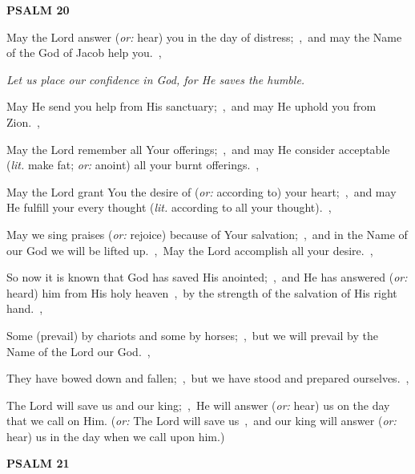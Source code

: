 \documentclass[12pt,twoside,a5paper]{article}
\newcommand{\psalm}[1]{\textbf{PSALM {#1}}}
\newcommand{\qanona}[1]{{\liturgicalhint{Qanona.} \emph{#1}}}
\newcommand{\translationoption}[1]{\emph{or:} #1}
\newcommand{\translationliteral}[1]{\emph{lit.} #1}
\begin{document}
\psalm{20}

\begin{normalparskip}
  May the Lord answer (\translationoption{hear}) you in the day of distress;~\sep\ and may the Name of the God of Jacob help you.~\sep

  \qanona{Let us place our confidence in God, for He saves the humble.}

  May He send you help from His sanctuary;~\sep\ and may He uphold you from Zion.~\sep

  May the Lord remember all Your offerings;~\sep\ and may He consider acceptable (\translationliteral{make fat}; \translationoption{anoint}) all your burnt offerings.~\sep

  May the Lord grant You the desire of (\translationoption{according to}) your heart;~\sep\ and may He fulfill your every thought (\translationliteral{according to all your thought}).~\sep

  May we sing praises (\translationoption{rejoice}) because of Your salvation;~\sep\ and in the Name of our God we will be lifted up.~\sep\ May the Lord accomplish all your desire.~\sep

  So now it is known that God has saved His anointed;~\sep\ and He has answered (\translationoption{heard}) him from His holy heaven~\sep\ by the strength of the salvation of His right hand.~\sep

  Some (prevail) by chariots and some by horses;~\sep\ but we will prevail by the Name of the Lord our God.~\sep

  They have bowed down and fallen;~\sep\ but we have stood and prepared ourselves.~\sep

  The Lord will save us and our king;~\sep\ He will answer (\translationoption{hear}) us on the day that we call on Him. (\translationoption{The Lord will save us~\sep\ and our king will answer (\translationoption{hear}) us in the day when we call upon him.})
\end{normalparskip}

\psalm{21}
\end{document}

